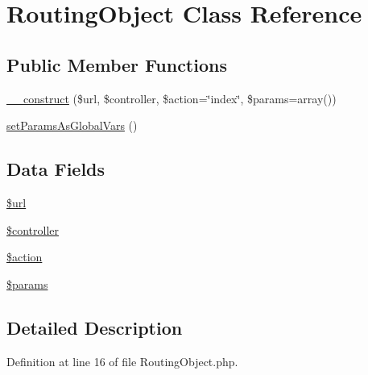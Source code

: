 \hypertarget{class_routing_object}{\section{\-Routing\-Object \-Class \-Reference}
\label{class_routing_object}
}
\subsection*{\-Public \-Member \-Functions}
\begin{DoxyCompactItemize}
\item 
\hyperlink{class_routing_object_adacdbfafde45e79f2d7d674a9d948c59}{\-\_\-\-\_\-construct} (\$url, \$controller, \$action=\char`\"{}index\char`\"{}, \$params=array())
\item 
\hyperlink{class_routing_object_ac3b694bc9a204677b7cebe2796453b5f}{set\-Params\-As\-Global\-Vars} ()
\end{DoxyCompactItemize}
\subsection*{\-Data \-Fields}
\begin{DoxyCompactItemize}
\item 
\hyperlink{class_routing_object_acf215f34a917d014776ce684a9ee8909}{\$url}
\item 
\hyperlink{class_routing_object_a388ef7b1db5e6f728e63cee704ce6e23}{\$controller}
\item 
\hyperlink{class_routing_object_aa698a3e72116e8e778be0e95d908ee30}{\$action}
\item 
\hyperlink{class_routing_object_afe68e6fbe7acfbffc0af0c84a1996466}{\$params}
\end{DoxyCompactItemize}


\subsection{\-Detailed \-Description}


\-Definition at line 16 of file \-Routing\-Object.\-php.



